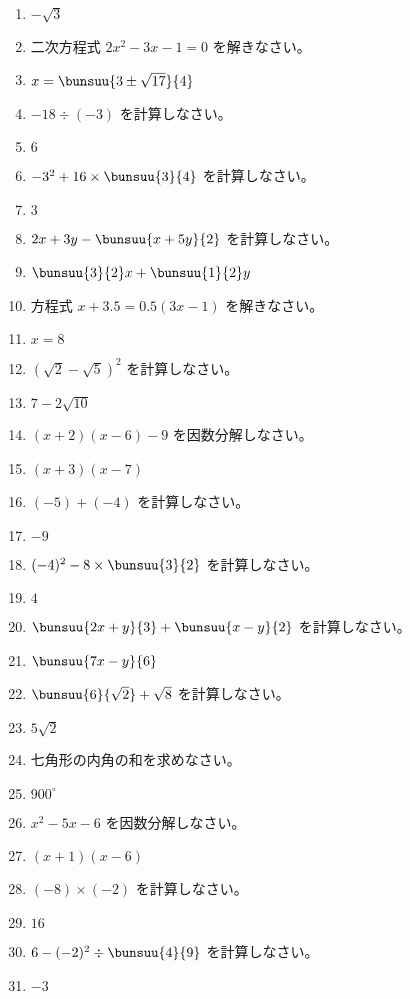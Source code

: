 \documentclass[uplatex,a4j,11pt]{jsreport}
\begin{document}
\begin{multicols}{2}
\begin{enumerate}
    \item $-\sqrt{3}$
    \item 二次方程式 $2x^2-3x-1=0$ を解きなさい。%
    \item $x=\bunsuu{3\pm\sqrt{17}}{4}$
    \item $-18\div(-3)$ を計算しなさい。%
    \item $6$
    \item $-3^2+16\times\bunsuu{3}{4}$ を計算しなさい。%
    \item $3$
    \item $2x+3y-\bunsuu{x+5y}{2}$ を計算しなさい。%
    \item $\bunsuu{3}{2}x+\bunsuu{1}{2}y$
    \item 方程式 $x+3.5=0.5(3x-1)$ を解きなさい。%
    \item $x=8$
    \item $(\sqrt{2}-\sqrt{5})^2$ を計算しなさい。%
    \item $7-2\sqrt{10}$
    \item $(x+2)(x-6)-9$ を因数分解しなさい。%
    \item $(x+3)(x-7)$
    \item $(-5)+(-4)$ を計算しなさい。%
    \item $-9$
    \item $(-4)^2-8\times\bunsuu{3}{2}$ を計算しなさい。%
    \item $4$
    \item $\bunsuu{2x+y}{3}+\bunsuu{x-y}{2}$ を計算しなさい。%
    \item $\bunsuu{7x-y}{6}$
    \item $\bunsuu{6}{\sqrt{2}}+\sqrt{8}$ を計算しなさい。%
    \item $5\sqrt{2}$
    \item 七角形の内角の和を求めなさい。%
    \item $900^\circ$
    \item $x^2-5x-6$ を因数分解しなさい。%
    \item $(x+1)(x-6)$
    \item $(-8)\times(-2)$ を計算しなさい。%
    \item $16$
    \item $6-(-2)^2\div\bunsuu{4}{9}$ を計算しなさい。%
    \item $-3$

\end{enumerate}
\end{multicols}
\end{document}
